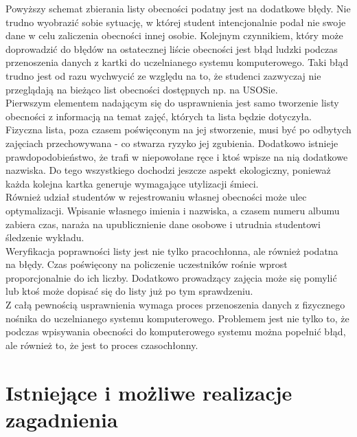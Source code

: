 \documentclass[declaration,shortabstract, mgr]{iithesis}
\begin{document}
\indent Powyższy schemat zbierania listy obecności podatny jest na dodatkowe błędy. Nie trudno wyobrazić sobie sytuację, w której student intencjonalnie podał nie swoje dane w celu zaliczenia obecności innej osobie. Kolejnym czynnikiem, który może doprowadzić do błędów na ostatecznej liście obecności jest błąd ludzki podczas przenoszenia danych z kartki do uczelnianego systemu komputerowego. Taki błąd trudno jest od razu wychwycić ze względu na to, że studenci zazwyczaj nie przeglądają na bieżąco list obecności dostępnych np. na USOSie.\\
\indent Pierwszym elementem nadającym się do usprawnienia jest samo tworzenie listy obecności z informacją na temat zajęć, których ta lista będzie dotyczyła. Fizyczna lista, poza czasem poświęconym na jej stworzenie, musi być po odbytych zajęciach przechowywana - co stwarza ryzyko jej zgubienia. Dodatkowo istnieje prawdopodobieństwo, że trafi w niepowołane ręce i ktoś wpisze na nią dodatkowe nazwiska. Do tego wszystkiego dochodzi jeszcze aspekt ekologiczny, ponieważ każda kolejna kartka generuje wymagające utylizacji śmieci. \\
\indent Również udział studentów w rejestrowaniu własnej obecności może ulec optymalizacji. Wpisanie własnego imienia i nazwiska, a czasem numeru albumu zabiera czas, naraża na upublicznienie dane osobowe i utrudnia studentowi śledzenie wykładu.\\
\indent Weryfikacja poprawności listy jest nie tylko pracochłonna, ale również podatna na błędy. Czas poświęcony na policzenie uczestników rośnie wprost proporcjonalnie do ich liczby. Dodatkowo prowadzący zajęcia może się pomylić lub ktoś może dopisać się do listy już po tym sprawdzeniu.\\
\indent Z całą pewnością usprawnienia wymaga proces przenoszenia danych z fizycznego nośnika do uczelnianego systemu komputerowego. Problemem jest nie tylko to, że podczas wpisywania obecności do komputerowego systemu można popełnić błąd, ale również to, że jest to proces czasochłonny.\\

\section{Istniejące i możliwe realizacje zagadnienia}
\end{document}
